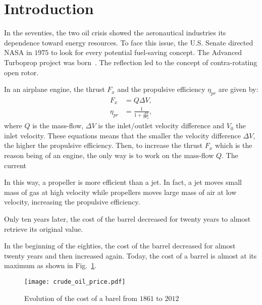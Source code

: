 
\section{Introduction}
\label{sec:ca_introduction}

In the seventies, the two oil crisis showed the aeronautical industries its dependence
toward energy resources. To face this issue, the U.S. Senate directed NASA in $1975$
to look for every potential fuel-saving concept. The Advanced Turboprop
project was born~\cite{Hager1988}. The reflection led to the
concept of contra-rotating open rotor.

In an airplane engine, 
the thrust $F_x$ and the propulsive efficiency $\eta_{pr}$ are given by:
\begin{equation}
  \begin{split}
    F_x &= Q \Delta V, \\
    \eta_{pr} &= \displaystyle \frac{1}{1 + \displaystyle \frac{\Delta V}{2 V_0}},
  \end{split}
\end{equation}
where $Q$ is the mass-flow, $\Delta V$ is the inlet/outlet velocity difference and $V_0$
the inlet velocity. These equations means that the 
smaller the velocity difference $\Delta V$, the higher the propulsive efficiency.
Then, to increase the thrust $F_x$ which is the reason being of an engine,
the only way is to work on the mass-flow $Q$.
The current

In this way, a propeller is more efficient than a jet. In fact, a jet 
moves small mass of gas at high velocity while propellers moves 
large mass of air at low velocity, increasing the propulsive efficiency.

Only ten years later, the cost of 
the barrel decreased for twenty years to almost retrieve its original
value. 

In the beginning of the eighties, the cost of 
the barrel decreased for almost twenty years and then increased again.
Today, the cost of a barrel is almost at its maximum as shown
in Fig.~\ref{fig:crude_oil_price}.
\begin{figure}[htbp]
  \centering
  \texttt{[image: crude\_oil\_price.pdf]}
  \caption{Evolution of the cost of a barel from $1861$ to $2012$ \cite{bpreview2013}}
  \label{fig:crude_oil_price}
\end{figure}

